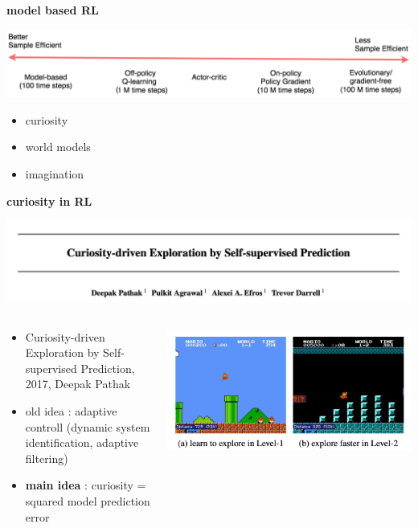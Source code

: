 \documentclass[xcolor=dvipsnames]{beamer}
\begin{document}
\begin{frame}{\bf model based RL}

  {\centering \includegraphics[scale=0.22]{../images/samples.png}}

  \begin{itemize}
    \item curiosity
    \item world models
    \item imagination
  \end{itemize}

\end{frame}

\begin{frame}{\bf curiosity in RL}

  \includegraphics[scale=0.2]{../images/paper_curiosity_0.png}


  \begin{columns}

    \begin{column}{0.5\textwidth}
      \begin{itemize}
        \item Curiosity-driven Exploration by Self-supervised Prediction, 2017, Deepak Pathak
        \item old idea : adaptive controll (dynamic system identification, adaptive filtering)
        \item {\bf \color{red} main idea } : curiosity = squared model prediction error
      \end{itemize}
    \end{column}

    \begin{column}{0.5\textwidth}
      {\centering \includegraphics[scale=0.4]{../images/paper_curiosity_1.png}}
    \end{column}

  \end{columns}
\end{frame}
\end{document}
